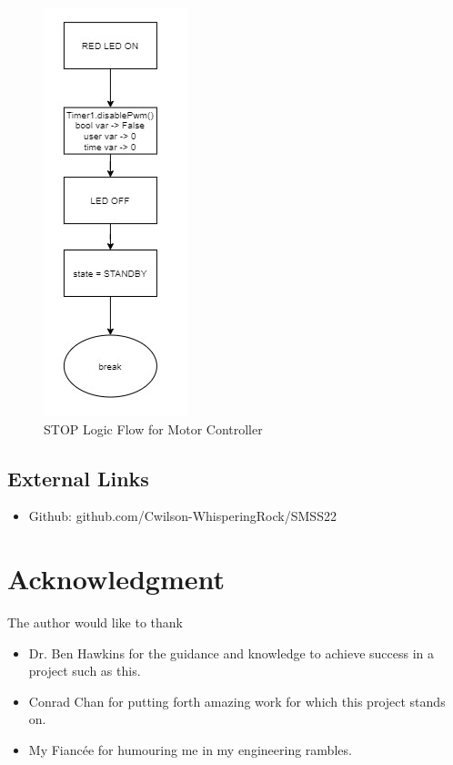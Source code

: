 \documentclass[journal]{IEEEtran}
\begin{document}
         \begin{figure}[H]
            \centering
            \includegraphics[scale = 1]{Images/STOP_ver1.jpg}
            \caption{STOP Logic Flow for Motor Controller}
            \label{fig:STOP_mc}
        \end{figure}
        
        
        
        
    \subsection{External Links}
        \begin{itemize}
            \item Github: github.com/Cwilson-WhisperingRock/SMSS22
        \end{itemize}
    
\section*{Acknowledgment}
    \label{Appendix:Ack}


    The author would like to thank
    \begin{itemize}
        \item Dr. Ben Hawkins for the guidance and knowledge to achieve success in a project such as this.
        \item Conrad Chan for putting forth amazing work for which this project stands on.
        \item My Fianc\'{e}e for humouring me in my engineering rambles. 
    \end{itemize}
\end{document}
